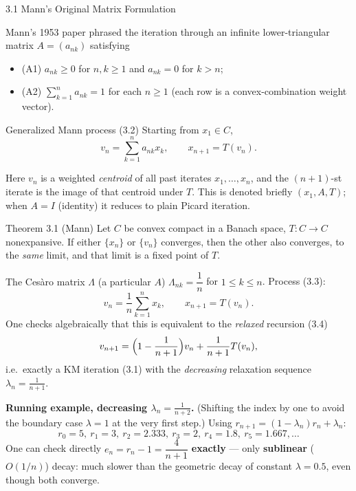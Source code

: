 \documentclass[aspectratio=169,10pt]{beamer}
\begin{document}
\begin{frame}[allowframebreaks]{3.1 Mann's Original Matrix Formulation}

  Mann's 1953 paper phrased the iteration through an infinite
  lower-triangular matrix $A=(a_{nk})$ satisfying
  \begin{itemize}
    \item (A1) $a_{nk}\ge0$ for $n,k\ge1$ and $a_{nk}=0$ for $k>n$;
    \item (A2) $\sum_{k=1}^n a_{nk}=1$ for each $n\ge1$ (each row is a
      convex-combination weight vector).
  \end{itemize}

  \begin{block}{Generalized Mann process (3.2)}
    Starting from $x_1\in C$,
    $$v_n=\sum_{k=1}^{n}a_{nk}x_k, \qquad x_{n+1}=T(v_n).$$
  \end{block}
  Here $v_n$ is a weighted \emph{centroid} of all past iterates
  $x_1,\dots,x_n$, and the $(n{+}1)$-st iterate is the image of that
  centroid under $T$. This is denoted briefly $(x_1,A,T)$; when $A=I$
  (identity) it reduces to plain Picard iteration.

  \begin{block}{Theorem 3.1 (Mann)}
    Let $C$ be convex compact in a Banach space, $T:C\to C$
    nonexpansive. If either $\{x_n\}$ or $\{v_n\}$ converges, then the
    other also converges, to the \emph{same} limit, and that limit is a
    fixed point of $T$.
  \end{block}

  \framebreak

  \begin{block}{The Ces\`aro matrix $\Lambda$ (a particular $A$)}
    $\Lambda_{nk}=\dfrac1n$ for $1\le k\le n$. Process (3.3):
    $$v_n=\frac1n\sum_{k=1}^n x_k, \qquad x_{n+1}=T(v_n).$$
    One checks algebraically that this is equivalent to the
    \emph{relaxed} recursion (3.4)
    $$v_{n+1}=\Bigl(1-\frac{1}{n+1}\Bigr)v_n+\frac{1}{n+1}T(v_n),$$
    i.e.\ exactly a KM iteration (3.1) with the \emph{decreasing}
    relaxation sequence $\lambda_n=\tfrac{1}{n+1}$.
  \end{block}

  \textbf{Running example, decreasing $\lambda_n=\frac{1}{n+2}$.}
  (Shifting the index by one to avoid the boundary case $\lambda=1$ at
  the very first step.) Using $r_{n+1}=(1-\lambda_n)r_n+\lambda_n$:
  $$r_0=5,\ r_1=3,\ r_2=2.333,\ r_3=2,\ r_4=1.8,\ r_5=1.667,\dots$$
  One can check directly $e_n=r_n-1=\dfrac{4}{n+1}$ \textbf{exactly} ---
  only \textbf{sublinear} ($O(1/n)$) decay: much slower than the
  geometric decay of constant $\lambda=0.5$, even though both converge.
\end{frame}
\end{document}
